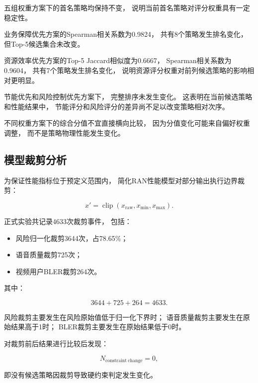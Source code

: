 \documentclass[lang=cn,12pt]{elegantbook}
\begin{document}
五组权重方案下的首名策略均保持不变，
说明当前首名策略对评分权重具有一定稳定性。

业务保障优先方案的Spearman相关系数为0.9824，
共有8个策略发生排名变化，
但Top-5候选集合未改变。

资源效率优先方案的Top-5 Jaccard相似度为0.6667，
Spearman相关系数为0.9604，
共有7个策略发生排名变化，
说明资源评分权重对前列候选策略的影响相对更明显。

节能优先和风险控制优先方案下，
完整排序未发生变化。
这表明在当前候选策略和性能结果中，
节能评分和风险评分的差异尚不足以改变策略相对次序。

不同权重方案下的综合分值不宜直接横向比较，
因为分值变化可能来自偏好权重调整，
而不是策略物理性能发生变化。


\subsection*{模型裁剪分析}

为保证性能指标位于预定义范围内，
简化RAN性能模型对部分输出执行边界裁剪：

\begin{equation}
x'
=
\operatorname{clip}
\left(
x_{\mathrm{raw}},
x_{\min},
x_{\max}
\right).
\label{eq:model_clipping_reduced}
\end{equation}

正式实验共记录4633次裁剪事件，
包括：

\begin{itemize}
    \item 风险归一化裁剪3644次，占78.65\%；
    \item 语音质量裁剪725次；
    \item 视频用户BLER裁剪264次。
\end{itemize}

其中：

\begin{equation}
3644+725+264=4633.
\label{eq:clipping_count_reduced}
\end{equation}

风险裁剪主要发生在风险原始值低于归一化下界时；
语音质量裁剪主要发生在原始结果高于1时；
BLER裁剪主要发生在原始结果低于0时。

对裁剪前后结果进行比较后发现：

\begin{equation}
N_{\mathrm{constraint\ change}}=0,
\label{eq:clipping_constraint_change_reduced}
\end{equation}

即没有候选策略因裁剪导致硬约束判定发生变化。
\end{document}
